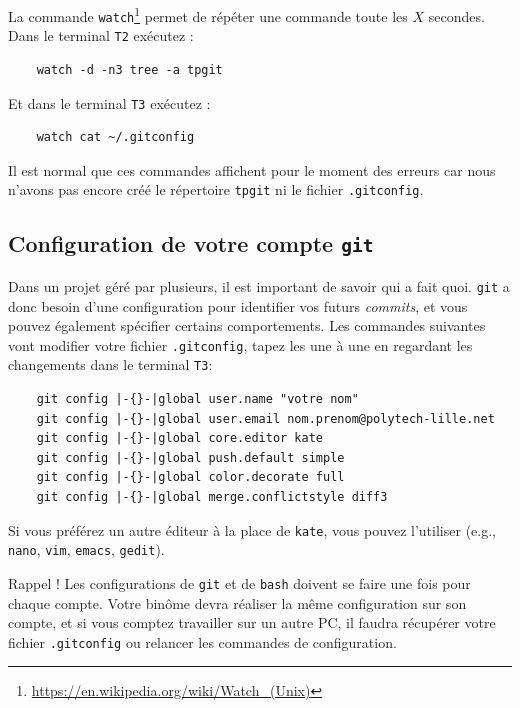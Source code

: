 \documentclass[final, a4paper, openbib, ]{article}
\begin{document}
La commande \texttt{watch}\footnote{\url{https://en.wikipedia.org/wiki/Watch\_(Unix)}} permet de répéter une commande toute les $X$ secondes. Dans le terminal \texttt{T2} exécutez :
\begin{verbatim}
	watch -d -n3 tree -a tpgit
\end{verbatim}

Et dans le terminal \texttt{T3} exécutez :
\begin{verbatim}
	watch cat ~/.gitconfig
\end{verbatim}

Il est normal que ces commandes affichent pour le moment des erreurs car nous n'avons pas encore créé le répertoire \texttt{tpgit} ni le fichier \texttt{.gitconfig}.


\subsection{Configuration de votre compte \texttt{git}}

Dans un projet géré par plusieurs, il est important de savoir qui a fait quoi. \texttt{git} a donc besoin d'une configuration pour identifier vos futurs \textit{commits}, et vous pouvez également spécifier certains comportements.
Les commandes suivantes vont modifier votre fichier \texttt{.gitconfig}, tapez les une à une en regardant les changements dans le terminal \texttt{T3}:

\begin{verbatim}
	git config |-{}-|global user.name "votre nom"
	git config |-{}-|global user.email nom.prenom@polytech-lille.net
	git config |-{}-|global core.editor kate
	git config |-{}-|global push.default simple
	git config |-{}-|global color.decorate full
	git config |-{}-|global merge.conflictstyle diff3
\end{verbatim}

Si vous préférez un autre éditeur à la place de \texttt{kate}, vous pouvez l'utiliser (e.g., \texttt{nano}, \texttt{vim}, \texttt{emacs}, \texttt{gedit}).

\begin{alertinfo}{Rappel !}
Les configurations de \texttt{git} et de \texttt{bash} doivent se faire une fois pour chaque compte.
Votre binôme devra réaliser la même configuration sur son compte, et si vous comptez travailler sur un autre PC, il faudra récupérer votre fichier \texttt{.gitconfig} ou relancer les commandes de configuration.
\end{alertinfo}
\end{document}
